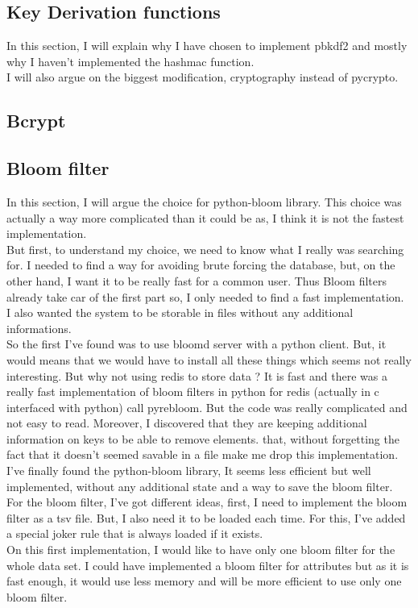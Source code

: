 \documentclass{eplmastersthesis}
\begin{document}
\subsection{Key Derivation functions}
In this section, I will explain why I have chosen to implement pbkdf2 and mostly why I haven't implemented the hashmac function.\\
I will also argue on the biggest modification, cryptography instead of pycrypto.

\subsection{Bcrypt}

\subsection{Bloom filter}
In this section, I will argue the choice for python-bloom library. This choice was actually a way more complicated than it could be as, I think it is not the fastest implementation.\\
But first, to understand my choice, we need to know what I really was searching for. I needed to find a way for avoiding brute forcing the database, but, on the other hand, I want it to be really fast for a common user. Thus Bloom filters already take car of the first part so, I only needed to find a fast implementation.\\
I also wanted the system to be storable in files without any additional informations.\\
So the first I've found was to use bloomd server with a python client. But, it would means that we would have to install all these things which seems not really interesting. But why not using redis to store data ? It is fast and there was a really fast implementation of bloom filters in python for redis (actually in c interfaced with python) call pyrebloom. But the code was really complicated and not easy to read. Moreover, I discovered that they are keeping additional information on keys to be able to remove elements. that, without forgetting the fact that it doesn't seemed savable in a file make me drop this implementation.\\
I've finally found the python-bloom library, It seems less efficient but well implemented, without any additional state and a way to save the bloom filter.\\

For the bloom filter, I've got different ideas, first, I need to implement the bloom filter as a tsv file. But, I also need it to be loaded each time. For this, I've added a special joker rule that is always loaded if it exists.\\
On this first implementation, I would like to have only one bloom filter for the whole data set. I could have implemented a bloom filter for attributes but as it is fast enough, it would use less memory and will be more efficient to use only one bloom filter.\\
\end{document}
